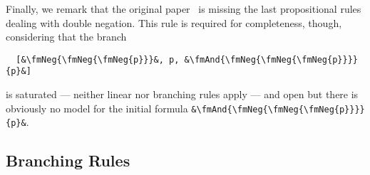 \documentclass[sigplan,10pt,anonymous,review]{acmart}
\newcommand{\fmAnd}[2]{#1 $\boldsymbol{\land}$ #2}
\newcommand{\fmOr}[2]{#1 $\boldsymbol{\lor}$ #2}
\newcommand{\fmNegSymbol}{\boldsymbol{\neg}}
\newcommand{\fmNeg}[1]{$\fmNegSymbol$ #1}
\begin{document}
Finally, we remark that the original paper~\cite{new_fast_tableau} is missing the last propositional rules dealing with double negation.
This rule is required for completeness, though, considering that the branch
\begin{lstlisting}
  [&\fmNeg{\fmNeg{\fmNeg{p}}}&, p, &\fmAnd{\fmNeg{\fmNeg{\fmNeg{p}}}}{p}&]
\end{lstlisting}
is saturated --- neither linear nor branching rules apply --- and open but there is obviously no model for the initial formula \lstinline!&\fmAnd{\fmNeg{\fmNeg{\fmNeg{p}}}}{p}&!.

\subsection{Branching Rules\label{sec:branching}}
\end{document}

